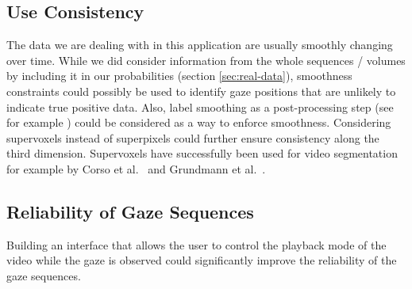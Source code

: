 \subsection{Use Consistency}
The data we are dealing with in this application are usually smoothly changing over time.
While we did consider information from the whole sequences / volumes by including it in our probabilities (section \ref{sec:real-data}), smoothness constraints could possibly be used to identify gaze positions that are unlikely to indicate true positive data. Also, label smoothing as a post-processing step (see for example \cite{zhou2004learning}) could be considered as a way to enforce smoothness.
Considering supervoxels instead of superpixels could further ensure consistency along the third dimension. Supervoxels have successfully been used for video segmentation for example by Corso et al.\ \cite{CoShDuTMI2008} and Grundmann et al.\ \cite{grundmann2010efficient}.

\subsection{Reliability of Gaze Sequences}
Building an interface that allows the user to control the playback mode of the video while the gaze is observed could significantly improve the reliability of the gaze sequences. 